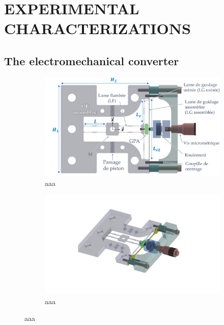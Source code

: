 \documentclass[3p,twocolumn,preprint]{elsarticle}
\begin{document}
\section{EXPERIMENTAL CHARACTERIZATIONS}
\label{sec:EXPERIMENTAL CHARACTERIZATIONS}
\lipsum[2]
	\subsection{The electromechanical converter}	
	\label{The electromechanical converter}
\begin{figure}[!htbp]
\begin{center}
\captionsetup{justification=centering}
	\begin{subfigure} [h!]{0.49\textwidth}
		\includegraphics[trim={1.4cm 0cm 0cm 0cm},clip,width=\textwidth]{figures/monobloc+GPA_face.pdf}
		\caption{aaa} 
		\label{fig:/monobloc+GPA_face}
	\end{subfigure}
	\begin{subfigure}[h!]{0.49\textwidth}
		\includegraphics[trim={6cm 3cm 7.5cm 2.6cm},clip, width=\textwidth]{figures/monobloc+GPA_iso.pdf}
		\caption{aaa}  
		\label{fig:/monobloc+GPA_iso}
	\end{subfigure}
	\caption{aaa}
\end{center}
\label{fig:/monobloc+GPA_face}
\end{figure}
\end{document}
